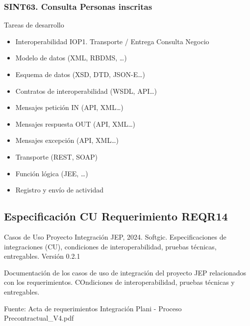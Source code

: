 \documentclass[
  paper=a4,
  ,captions=tableheading
]{scrartcl}
\providecommand{\tightlist}{%
  \setlength{\itemsep}{0pt}\setlength{\parskip}{0pt}}
\renewenvironment{quote}{\begin{customblockquote}\list{}{\rightmargin=0em\leftmargin=0em}%
\item\relax\color{blockquote-text}\ignorespaces}{\unskip\unskip\endlist\end{customblockquote}}
\begin{document}
\subsubsection{SINT63. Consulta Personas
inscritas}\label{sec:sint63.-consulta-personas-inscritas}

Tareas de desarrollo

\begin{itemize}
\tightlist
\item
  Interoperabilidad IOP1. Transporte / Entrega Consulta Negocio\\
\item
  Modelo de datos (XML, RBDMS, \ldots)
\item
  Esquema de datos (XSD, DTD, JSON-E\ldots)
\item
  Contratos de interoperabilidad (WSDL, API\ldots)
\item
  Mensajes petición IN (API, XML\ldots)
\item
  Mensajes respuesta OUT (API, XML\ldots)
\item
  Mensajes excepción (API, XML\ldots)
\item
  Transporte (REST, SOAP)
\item
  Función lógica (JEE, \ldots)
\item
  Registro y envío de actividad
\end{itemize}

\subsection{Especificación CU Requerimiento
REQR14}\label{sec:especificaciuxf3n-cu-requerimiento-reqr14}

\begin{quote}
Casos de Uso Proyecto Integración JEP, 2024. Softgic. Especificaciones
de integraciones (CU), condiciones de interoperabilidad, pruebas
técnicas, entregables. Versión 0.2.1
\end{quote}

Documentación de los casos de uso de integración del proyecto JEP
relacionados con los requerimientos. COndiciones de interoperabilidad,
pruebas técnicas y entregables.

Fuente: Acta de requerimientos Integración Plani - Proceso
Precontractual\_V4.pdf
\end{document}
